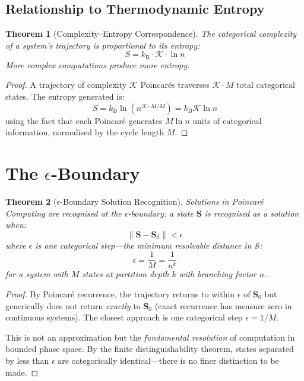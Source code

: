 \documentclass[twocolumn,10pt,a4paper]{article}
\theoremstyle{plain}
\newtheorem{theorem}{Theorem}[section]
\theoremstyle{definition}
\theoremstyle{remark}
\newcommand{\kB}{k_{\mathrm{B}}}
\newcommand{\Sspace}{\mathcal{S}}
\newcommand{\Scoord}{\mathbf{S}}
\begin{document}
\subsection{Relationship to Thermodynamic Entropy}

\begin{theorem}[Complexity--Entropy Correspondence]
\label{thm:complexity_entropy}
The categorical complexity of a system's trajectory is proportional to its entropy:
\begin{equation}
    S = \kB \cdot \mathcal{K} \cdot \ln n
\end{equation}
More complex computations produce more entropy.
\end{theorem}

\begin{proof}
A trajectory of complexity $\mathcal{K}$ Poincar\'{e}s traverses $\mathcal{K} \cdot M$ total categorical states. The entropy generated is:
\begin{equation}
    S = \kB \ln(n^{\mathcal{K} \cdot M/M}) = \kB \mathcal{K} \ln n
\end{equation}
using the fact that each Poincar\'{e} generates $M \ln n$ units of categorical information, normalised by the cycle length $M$.
\end{proof}

\section{The $\epsilon$-Boundary}
\label{sec:epsilon}

\begin{theorem}[$\epsilon$-Boundary Solution Recognition]
\label{thm:epsilon}
Solutions in Poincar\'{e} Computing are recognised at the \emph{$\epsilon$-boundary}: a state $\Scoord$ is recognised as a solution when:
\begin{equation}
    \|\Scoord - \Scoord_0\| < \epsilon
\end{equation}
where $\epsilon$ is one categorical step---the minimum resolvable distance in $\Sspace$:
\begin{equation}
    \epsilon = \frac{1}{M} = \frac{1}{n^k}
\end{equation}
for a system with $M$ states at partition depth $k$ with branching factor $n$.
\end{theorem}

\begin{proof}
By Poincar\'{e} recurrence, the trajectory returns to within $\epsilon$ of $\Scoord_0$ but generically does not return \emph{exactly} to $\Scoord_0$ (exact recurrence has measure zero in continuous systems). The closest approach is one categorical step $\epsilon = 1/M$.

This is not an approximation but the \emph{fundamental resolution} of computation in bounded phase space. By the finite distinguishability theorem, states separated by less than $\epsilon$ are categorically identical---there is no finer distinction to be made.
\end{proof}
\end{document}
